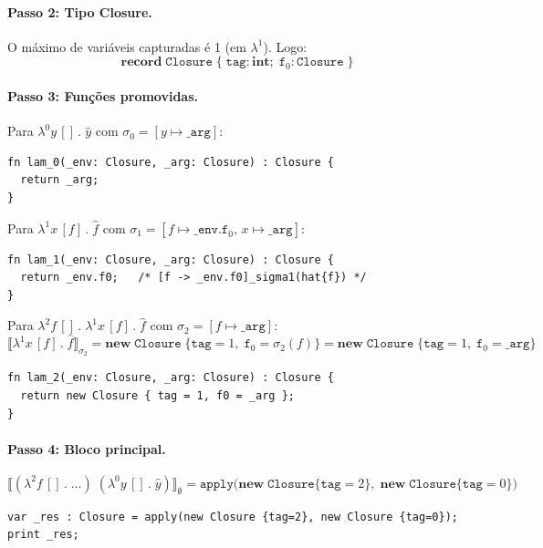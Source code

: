 \paragraph{Passo 2: Tipo Closure.}

O máximo de variáveis capturadas é 1 (em \(\lambda^1\)). Logo:
\[
  \mathbf{record}\;\mathtt{Closure}\;\{\;\mathtt{tag}:
  \mathbf{int};\;\mathtt{f}_0: \mathtt{Closure}\;\}
\]

\paragraph{Passo 3: Funções promovidas.}

Para \(\lambda^0 y\,[]\,.\;\hat{y}\) com \(\sigma_0 = [y \mapsto
\mathtt{\_arg}]\):
\begin{verbatim}
fn lam_0(_env: Closure, _arg: Closure) : Closure {
  return _arg;
}
\end{verbatim}

Para \(\lambda^1 x\,[f]\,.\;\hat{f}\) com \(\sigma_1 = [f \mapsto
\mathtt{\_env.f}_0,\, x \mapsto \mathtt{\_arg}]\):
\begin{verbatim}
fn lam_1(_env: Closure, _arg: Closure) : Closure {
  return _env.f0;   /* [f -> _env.f0]_sigma1(hat{f}) */
}
\end{verbatim}

Para \(\lambda^2 f\,[]\,.\;\lambda^1 x\,[f]\,.\;\hat{f}\) com
\(\sigma_2 = [f \mapsto \mathtt{\_arg}]\):
\[
  \llbracket \lambda^1 x\,[f]\,.\;\hat{f} \rrbracket_{\sigma_2}
  = \mathbf{new}\;\mathtt{Closure}\;\{\mathtt{tag}=1,\;
  \mathtt{f}_0 = \sigma_2(f)\}
  = \mathbf{new}\;\mathtt{Closure}\;\{\mathtt{tag}=1,\;
  \mathtt{f}_0 = \mathtt{\_arg}\}
\]
\begin{verbatim}
fn lam_2(_env: Closure, _arg: Closure) : Closure {
  return new Closure { tag = 1, f0 = _arg };
}
\end{verbatim}

\paragraph{Passo 4: Bloco principal.}

\[
  \llbracket (\lambda^2 f\,[]\,.\;\ldots)\;(\lambda^0
  y\,[]\,.\;\hat{y}) \rrbracket_\emptyset
  = \mathtt{apply}\bigl(
    \mathbf{new}\;\mathtt{Closure}\{\mathtt{tag}=2\},\;
    \mathbf{new}\;\mathtt{Closure}\{\mathtt{tag}=0\}
  \bigr)
\]

\begin{verbatim}
var _res : Closure = apply(new Closure {tag=2}, new Closure {tag=0});
print _res;
\end{verbatim}

